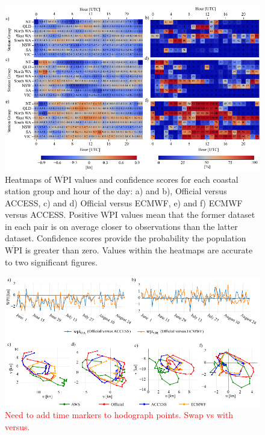 \documentclass[alpha-refs]{wiley-article}
\begin{document}
\begin{figure}
\centering
\includegraphics{wpi_coastal.pdf}
\caption{Heatmaps of $\overline{\text{WPI}}$ values and confidence scores for each coastal station group and hour of the day: a) and b), Official versus ACCESS, c) and d) Official versus ECMWF, e) and f) ECMWF versus ACCESS. Positive $\overline{\text{WPI}}$ values mean that the former dataset in each pair is on average closer to observations than the latter dataset. Confidence scores provide the probability the population $\overline{\text{WPI}}$ is greater than zero. Values within the heatmaps are accurate to two significant figures.}
\label{Fig:wpi_coastal}
\end{figure}

\begin{figure}
\centering
\includegraphics{case_studies.pdf}
\caption{\textcolor{red}{Need to add time markers to hodograph points. Swap vs with versus.}}
\label{Fig:case_studies}
\end{figure}
\end{document}
